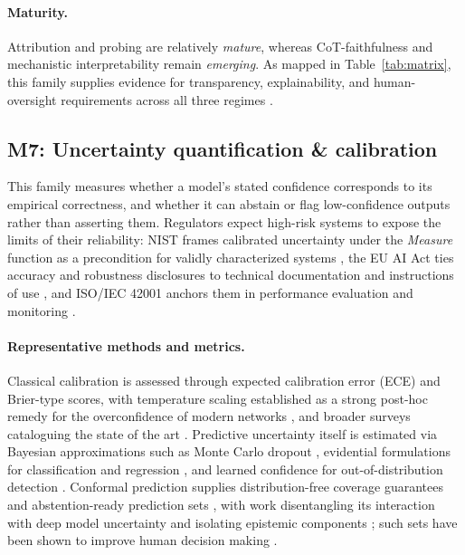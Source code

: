 \paragraph{Maturity.} Attribution and probing are relatively \textit{mature}, whereas CoT-faithfulness and mechanistic interpretability remain \textit{emerging}. As mapped in Table~\ref{tab:matrix}, this family supplies evidence for transparency, explainability, and human-oversight requirements across all three regimes \cite{nist2023airmf,euaiact2024,iso42001}.

\subsection{M7: Uncertainty quantification \& calibration}

This family measures whether a model's stated confidence corresponds to its empirical correctness, and whether it can abstain or flag low-confidence outputs rather than asserting them. Regulators expect high-risk systems to expose the limits of their reliability: NIST frames calibrated uncertainty under the \textit{Measure} function as a precondition for validly characterized systems \cite{nist2023airmf}, the EU AI Act ties accuracy and robustness disclosures to technical documentation and instructions of use \cite{euaiact2024}, and ISO/IEC 42001 anchors them in performance evaluation and monitoring \cite{iso42001}.

\paragraph{Representative methods and metrics.} Classical calibration is assessed through expected calibration error (ECE) and Brier-type scores, with temperature scaling established as a strong post-hoc remedy for the overconfidence of modern networks \cite{guo2017calibration}, and broader surveys cataloguing the state of the art \cite{wang2023calibration}. Predictive uncertainty itself is estimated via Bayesian approximations such as Monte Carlo dropout \cite{gal2016bayesian}, evidential formulations for classification \cite{sensoy2018evidential} and regression \cite{amini2020deepevidential}, and learned confidence for out-of-distribution detection \cite{devries2018confidence}. Conformal prediction supplies distribution-free coverage guarantees and abstention-ready prediction sets \cite{angelopoulos2023conformal}, with work disentangling its interaction with deep model uncertainty \cite{barella2023quantifying} and isolating epistemic components \cite{ravi2026epistemic}; such sets have been shown to improve human decision making \cite{cresswell2024conformal}.

